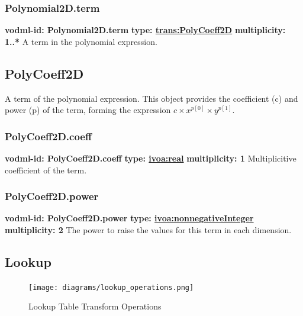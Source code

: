     \subsubsection{Polynomial2D.term}
      \textbf{vodml-id: Polynomial2D.term} \newline
      \textbf{type: \hyperref[sect:PolyCoeff2D]{trans:PolyCoeff2D}} \newline
      \textbf{multiplicity: 1..*} \newline 
      A term in the polynomial expression.

  \subsection{PolyCoeff2D}
  \label{sect:PolyCoeff2D}
    A term of the polynomial expression. This object provides the coefficient (c) and power (p) of the term, forming the expression $c \times x^{p[0]} \times y^{p[1]}$.

    \subsubsection{PolyCoeff2D.coeff}
      \textbf{vodml-id: PolyCoeff2D.coeff} \newline
      \textbf{type: \hyperref[sect:ivoa]{ivoa:real}} \newline
      \textbf{multiplicity: 1} \newline 
      Multiplicitive coefficient of the term.

    \subsubsection{PolyCoeff2D.power}
      \textbf{vodml-id: PolyCoeff2D.power} \newline
      \textbf{type: \hyperref[sect:ivoa]{ivoa:nonnegativeInteger}} \newline
      \textbf{multiplicity: 2} \newline 
      The power to raise the values for this term in each dimension.

  \subsection{Lookup}
  \label{sect:Lookup}

    \begin{figure}[h]
    \begin{center}
      \texttt{[image: diagrams/lookup\_operations.png]}
      \caption{Lookup Table Transform Operations}\label{fig:LookupOps}
    \end{center}
    \end{figure}

